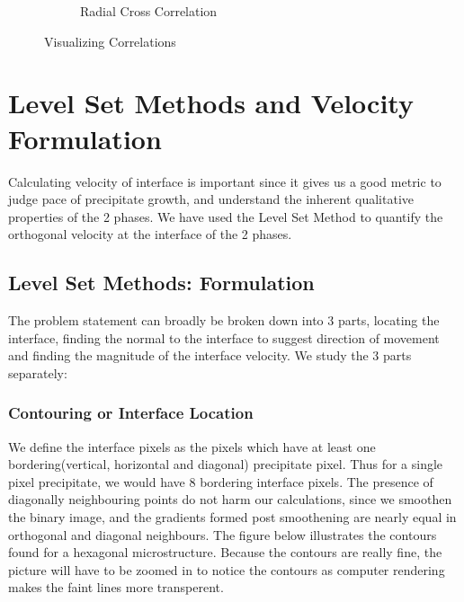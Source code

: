 \documentclass[12pt, a4paper]{report}
\begin{document}
\begin{figure}[H]
\begin{subfigure}{.45\textwidth}
  \caption{Radial Cross Correlation}
  \label{img:microstrImg}

\end{subfigure}

\caption{Visualizing Correlations}
\label{fig:test}
\end{figure}


\chapter{Level Set Methods and Velocity Formulation}

Calculating velocity of interface is important since it gives us a good metric to judge pace of precipitate growth, and understand the inherent qualitative properties of the 2 phases. We have used the Level Set Method to quantify the orthogonal velocity at the interface of the 2 phases.
 
\section{Level Set Methods: Formulation}
The problem statement can broadly be broken down into 3 parts, locating the interface, finding the normal to the interface to suggest direction of movement and finding the magnitude of the interface velocity. We study the 3 parts separately:

\subsection{Contouring or Interface Location}
We define the interface pixels as the pixels which have at least one bordering(vertical, horizontal and diagonal) precipitate pixel. Thus for a single pixel precipitate, we would have 8 bordering interface pixels. The presence of diagonally neighbouring points do not harm our calculations, since we smoothen the binary image, and the gradients formed post smoothening are nearly equal in orthogonal and diagonal neighbours. The figure below illustrates the contours found for a hexagonal microstructure. Because the contours are really fine, the picture will have to be zoomed in to notice the contours as computer rendering makes the faint lines more transperent.
\end{document}
